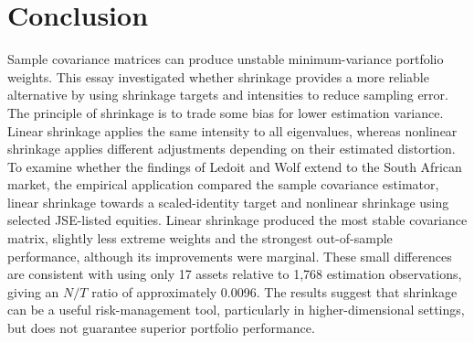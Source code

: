 \section{Conclusion}

Sample covariance matrices can produce unstable minimum-variance portfolio weights. This essay investigated whether shrinkage provides a more reliable alternative by using shrinkage targets and intensities to reduce sampling error. The principle of shrinkage is to trade some bias for lower estimation variance. Linear shrinkage applies the same intensity to all eigenvalues, whereas nonlinear shrinkage applies different adjustments depending on their estimated distortion. To examine whether the findings of Ledoit and Wolf extend to the South African market, the empirical application compared the sample covariance estimator, linear shrinkage towards a scaled-identity target and nonlinear shrinkage using selected JSE-listed equities. Linear shrinkage produced the most stable covariance matrix, slightly less extreme weights and the strongest out-of-sample performance, although its improvements were marginal. These small differences are consistent with using only 17 assets relative to 1,768 estimation observations, giving an \(N/T\) ratio of approximately 0.0096. The results suggest that shrinkage can be a useful risk-management tool, particularly in higher-dimensional settings, but does not guarantee superior portfolio performance.

